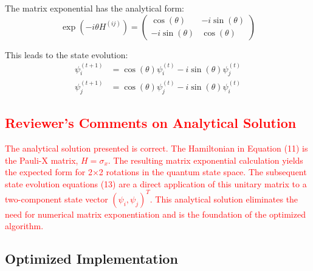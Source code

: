 \documentclass[11pt,a4paper]{article}
\begin{document}
The matrix exponential has the analytical form:
\begin{equation}
\exp(-i\theta H^{(ij)}) = \begin{pmatrix}
\cos(\theta) & -i\sin(\theta) \\
-i\sin(\theta) & \cos(\theta)
\end{pmatrix}
\end{equation}

This leads to the state evolution:
\begin{align}
\psi_i^{(t+1)} &= \cos(\theta) \psi_i^{(t)} - i\sin(\theta) \psi_j^{(t)}\\
\psi_j^{(t+1)} &= \cos(\theta) \psi_j^{(t)} - i\sin(\theta) \psi_i^{(t)}
\end{align}

\textcolor{red}{
\subsection*{Reviewer's Comments on Analytical Solution}
The analytical solution presented is correct. The Hamiltonian in Equation (11) is the Pauli-X matrix, $H = \sigma_x$. The resulting matrix exponential calculation yields the expected form for 2×2 rotations in the quantum state space. The subsequent state evolution equations (13) are a direct application of this unitary matrix to a two-component state vector $(\psi_i, \psi_j)^T$. This analytical solution eliminates the need for numerical matrix exponentiation and is the foundation of the optimized algorithm.
}

\subsection{Optimized Implementation}
\end{document}

